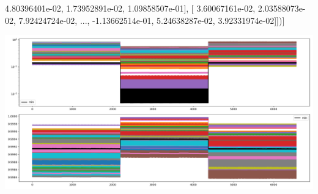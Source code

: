 \documentclass{article}
\begin{document}
          4.80396401e-02,   1.73952891e-02,   1.09858507e-01],
       [  3.60067161e-02,   2.03588073e-02,   7.92424724e-02, ...,
         -1.13662514e-01,   5.24638287e-02,   3.92331974e-02]])]
\begin{center}
\includegraphics[scale=.9]{report_pickled_controlsaws1/control_dpn_all}

\end{center}
\end{document}
